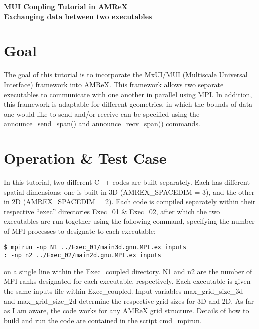 \documentclass[12pt,letterpaper]{article}
\begin{document}
\vspace*{0.35in}

\begin{centering}
{
\Large
\textbf{MUI Coupling Tutorial in AMReX} \\
\large
\textbf{Exchanging data between two executables} \\
}

\end{centering}

\section*{Goal}

\noindent The goal of this tutorial is to incorporate the MxUI/MUI (Multiscale Universal Interface) framework into AMReX. This framework allows two separate executables to communicate with one another in parallel using MPI. In addition, this framework is adaptable for different geometries, in which the bounds of data one would like to send and/or receive can be specified using the {\selectfont announce\_send\_span()} and {\selectfont announce\_recv\_span()} commands.

\section*{Operation \& Test Case}

\noindent In this tutorial, two different C++ codes are built separately. Each has different spatial dimensions: one is built in 3D ({\selectfont AMREX\_SPACEDIM = 3}), and the other in 2D ({\selectfont AMREX\_SPACEDIM = 2}). Each code is compiled separately within their respective ``exec'' directories {\selectfont Exec\_01 \& Exec\_02}, after which the two executables are run together using the following command, specifying the number of MPI processes to designate to each executable:

\begin{verbatim}
$ mpirun -np N1 ../Exec_01/main3d.gnu.MPI.ex inputs
: -np n2 ../Exec_02/main2d.gnu.MPI.ex inputs
\end{verbatim}

\noindent on a single line within the {\selectfont Exec\_coupled} directory. {\selectfont N1} and {\selectfont n2} are the number of MPI ranks designated for each executable, respectively. Each executable is given the same inputs file within {\selectfont Exec\_coupled}. Input variables {\selectfont max\_grid\_size\_3d} and {\selectfont max\_grid\_size\_2d} determine the respective grid sizes for 3D and 2D. As far as I am aware, the code works for any AMReX grid structure. Details of how to build and run the code are contained in the script {\selectfont cmd\_mpirun}.\\
\end{document}
